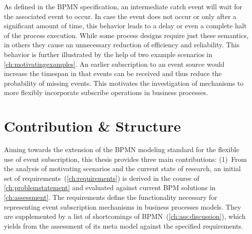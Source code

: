 As defined in the BPMN specification, an intermediate catch event will wait for the associated event to occur. In case the event does not occur or only after a significant amount of time, this behavior leads to a delay or even a complete halt of the process execution. %
While some process designs require just these semantics, in others they cause an unnecessary reduction of efficiency and reliability.%
This behavior is further illustrated by the help of two example scenarios in \autoref{ch:motivatingexamples}.
An earlier subscription to an event source would increase the timespan in that events can be received and thus reduce the probability of missing events.
This motivates the investigation of mechanisms to more flexibly incorporate subscribe operations in business processes.


\section{Contribution \& Structure}
Aiming towards the extension of the BPMN modeling standard for the flexible use of event subscription, this thesis provides three main contributions:
(1)~From the analysis of motivating scenarios and the current state of research, an initial set of requirements~(\autoref{ch:requirements}) is derived in the course of \autoref{ch:problemstatement} and evaluated against current BPM solutions in \autoref{ch:assessment}.
The requirements define the functionality necessary for representing event subscription mechanisms in business processes models. 
They are supplemented by a list of shortcomings of BPMN~(\autoref{ch:ass:discussion}), which yields from the assessment of its meta model against the specified requirements.


